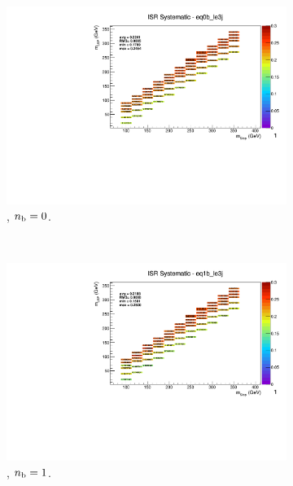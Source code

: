 \begin{figure}[ht!]
  \begin{subfigure}[b]{0.32\textwidth}
    \includegraphics[width=\textwidth, page=1]{Figs/sms/t2cc/v37/systs/T2cc_ISR_eq0b_le3j.pdf}
    \caption{\njlow, $n_{\text{b}} = 0$.}
  \end{subfigure}\\
  \begin{subfigure}[b]{0.32\textwidth}
    \includegraphics[width=\textwidth, page=12]{Figs/sms/t2cc/v37/systs/T2cc_ISR_eq1b_le3j.pdf}
    \caption{\njlow, $n_{\text{b}} = 1$.}
  \end{subfigure}
  \begin{subfigure}[b]{0.32\textwidth}

\end{subfigure}
\end{figure}
